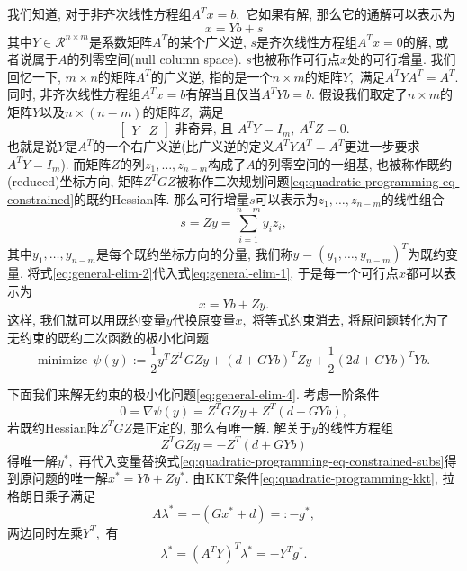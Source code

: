 \documentclass{SBCbookchapter}
\newcommand{\R}{\mathcal{R}}
\numberwithin{equation}{section}
\begin{document}
我们知道, 对于非齐次线性方程组$A^Tx = b,$ 它如果有解, 那么它的通解可以表示为
\begin{equation}
\label{eq:general-elim-1}
x = Y b + s
\end{equation}
其中$Y \in \R^{n\times m}$是系数矩阵$A^T$的某个广义逆, $s$是齐次线性方程组$A^T x = 0$的解, 或者说属于$A$的列零空间(null column space). $s$也被称作可行点$x$处的可行增量. 我们回忆一下, $m\times n$的矩阵$A^T$的广义逆, 指的是一个$n\times m$的矩阵$Y,$ 满足$A^T Y A^T = A^T.$ 同时, 非齐次线性方程组$A^Tx = b$有解当且仅当$A^T Y b = b.$ 假设我们取定了$n\times m$的矩阵$Y$以及$n \times (n-m)$的矩阵$Z,$ 满足
\begin{equation}
\label{eq:eq:general-elim-req}
\begin{bmatrix} Y & Z\end{bmatrix} \text{ 非奇异, 且~} A^T Y = I_m, ~ A^T Z = 0.
\end{equation}
也就是说$Y$是$A^T$的一个右广义逆(比广义逆的定义$A^T Y A^T = A^T$更进一步要求$A^T Y = I_m$). 而矩阵$Z$的列$z_1, \ldots, z_{n-m}$构成了$A$的列零空间的一组基, 也被称作既约(reduced)坐标方向, 矩阵$Z^T G Z$被称作二次规划问题\eqref{eq:quadratic-programming-eq-constrained}的既约Hessian阵. 那么可行增量$s$可以表示为$z_1, \ldots, z_{n-m}$的线性组合
\begin{equation}
\label{eq:general-elim-2}
s = Z y = \sum\limits_{i=1}^{n-m} y_i z_i,
\end{equation}
其中$y_1, \ldots, y_{n-m}$是每个既约坐标方向的分量, 我们称$y = (y_1, \ldots, y_{n-m})^T$为既约变量. 将式\eqref{eq:general-elim-2}代入式\eqref{eq:general-elim-1}, 于是每一个可行点$x$都可以表示为
\begin{equation}
\label{eq:general-elim-3}
x = Y b + Z y.
\end{equation}
这样, 我们就可以用既约变量$y$代换原变量$x,$ 将等式约束消去, 将原问题转化为了无约束的既约二次函数的极小化问题
\begin{equation}
\label{eq:general-elim-4}
\text{minimize} ~~ \psi(y) := \frac{1}{2} y^T Z^T G Z y + \left( d + G Y b \right)^T Z y + \frac{1}{2} \left( 2d + G Y b \right)^T Y b.
\end{equation}

下面我们来解无约束的极小化问题\eqref{eq:general-elim-4}. 考虑一阶条件
\begin{equation}
\label{eq:general-elim-5}
0 = \nabla \psi (y) = Z^T G Z y + Z^T \left( d + G Y b \right),
\end{equation}
若既约Hessian阵$Z^T G Z$是正定的, 那么有唯一解. 解关于$y$的线性方程组
\begin{equation}
\label{eq:general-elim-y}
Z^T G Z y = - Z^T \left( d + G Y b \right)
\end{equation}
得唯一解$y^*,$ 再代入变量替换式\eqref{eq:quadratic-programming-eq-constrained-subs}得到原问题的唯一解$x^* = Y b + Z y^*.$ 由KKT条件\eqref{eq:quadratic-programming-kkt}, 拉格朗日乘子满足
\begin{equation}
\label{eq:general-elim-lagrange}
A\lambda^* = -\left( Gx^* + d \right) =: - g^*,
\end{equation}
两边同时左乘$Y^T,$ 有
\begin{equation}
\label{eq:general-elim-lambda}
\lambda^* = \left( A^T Y \right)^T \lambda^* = -Y^T g^*.
\end{equation}
\end{document}
